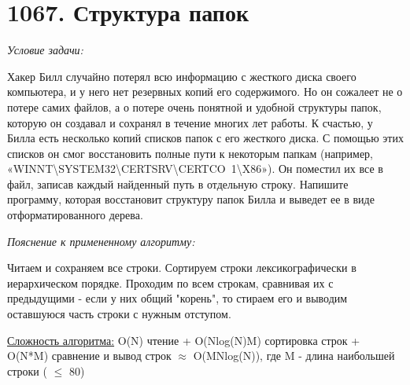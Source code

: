 \section{1067. Структура папок}
\textit{Условие задачи:} \par
Хакер Билл случайно потерял всю информацию с жесткого диска своего компьютера, и у него нет резервных копий его
содержимого. Но он сожалеет не о потере самих файлов, а о потере очень понятной и удобной структуры папок, которую
он создавал и сохранял в течение многих лет работы. К счастью, у Билла есть несколько копий списков папок с его
жесткого диска. С помощью этих списков он смог восстановить полные пути к некоторым папкам (например,
«WINNT\textbackslash SYSTEM32\textbackslash CERTSRV\textbackslash CERTCO~1\textbackslash X86»).
Он поместил их все в файл, записав каждый найденный путь в отдельную строку. Напишите программу, которая восстановит
структуру папок Билла и выведет ее в виде отформатированного дерева.

\textit{Пояснение к примененному алгоритму:} \par
Читаем и сохраняем все строки. Сортируем строки лексикографически в иерархическом порядке. Проходим по всем строкам,
сравнивая их с предыдущими - если у них общий "корень", то стираем его и выводим оставшуюся часть строки с нужным отступом.


\underline{Сложность алгоритма:} O(N)  чтение + O(Nlog(N)M) сортировка строк + O(N*M) сравнение и вывод строк $\approx$
O(MNlog(N)), где M - длина наибольшей строки ( $\leq$ 80)

